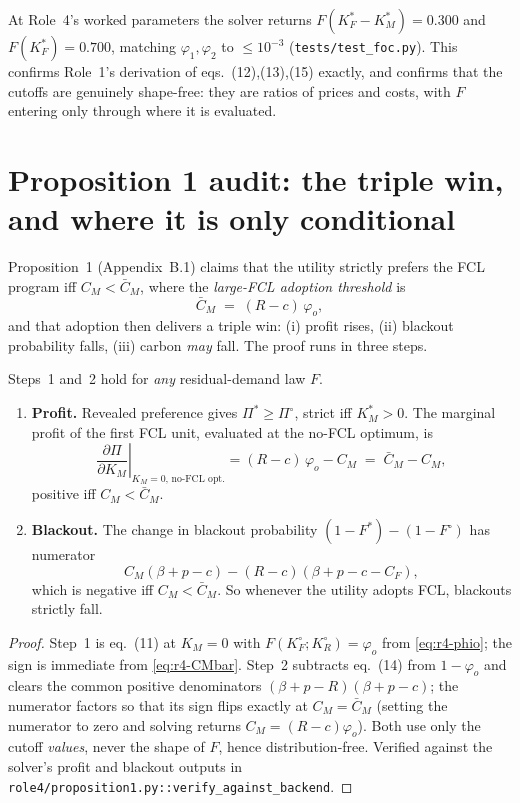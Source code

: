 \begin{remark}
At Role~4's worked parameters the solver returns $F(K_F^*-K_M^*)=0.300$ and
$F(K_F^*)=0.700$, matching $\varphi_1,\varphi_2$ to $\le 10^{-3}$
(\texttt{tests/test\_foc.py}). This confirms Role~1's derivation of eqs.~(12),(13),(15)
exactly, and confirms that the cutoffs are genuinely shape-free: they are ratios of
prices and costs, with $F$ entering only through where it is evaluated.
\end{remark}

\section{Proposition 1 audit: the triple win, and where it is only conditional}
\label{sec:r4-prop1}

Proposition~1 (Appendix~B.1) claims that the utility strictly prefers the FCL program
iff $C_M<\bar C_M$, where the \emph{large-FCL adoption threshold} is
\begin{equation}
\label{eq:r4-CMbar}
\bar C_M \;=\; (R-c)\,\varphi_o ,
\end{equation}
and that adoption then delivers a triple win: (i) profit rises, (ii) blackout
probability falls, (iii) carbon \emph{may} fall. The proof runs in three steps.

\begin{proposition}
\label{prop:r4-steps12}
Steps~1 and~2 hold for \emph{any} residual-demand law $F$.
\begin{enumerate}
\item[\textbf{(1)}] \textbf{Profit.} Revealed preference gives $\Pi^*\ge\Pi^\circ$,
strict iff $K_M^*>0$. The marginal profit of the first FCL unit, evaluated at the
no-FCL optimum, is
\[
\left.\frac{\partial\Pi}{\partial K_M}\right|_{K_M=0,\,\text{no-FCL opt.}}
= (R-c)\,\varphi_o - C_M \;=\; \bar C_M - C_M,
\]
positive iff $C_M<\bar C_M$.
\item[\textbf{(2)}] \textbf{Blackout.} The change in blackout probability
$(1-F^*)-(1-F^\circ)$ has numerator
\[
C_M(\beta+p-c) - (R-c)(\beta+p-c-C_F),
\]
which is negative iff $C_M<\bar C_M$. So whenever the utility adopts FCL, blackouts
strictly fall.
\end{enumerate}
\end{proposition}

\begin{proof}
Step~1 is eq.~(11) at $K_M=0$ with $F(K_F^\circ;K_R^\circ)=\varphi_o$ from
\eqref{eq:r4-phio}; the sign is immediate from \eqref{eq:r4-CMbar}. Step~2 subtracts
eq.~(14) from $1-\varphi_o$ and clears the common positive denominators
$(\beta+p-R)(\beta+p-c)$; the numerator factors so that its sign flips exactly at
$C_M=\bar C_M$ (setting the numerator to zero and solving returns $C_M=(R-c)\varphi_o$).
Both use only the cutoff \emph{values}, never the shape of $F$, hence
distribution-free. Verified against the solver's profit and blackout outputs in
\texttt{role4/proposition1.py::verify\_against\_backend}.
\end{proof}

